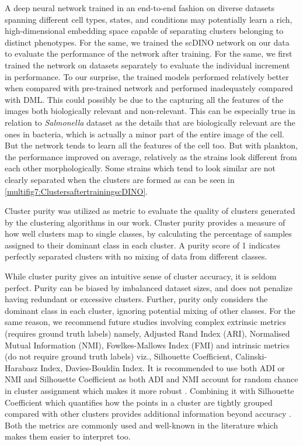\documentclass[12pt,a4paper]{article}
\begin{document}
A deep neural network trained in an end-to-end fashion on diverse datasets spanning different cell types, states, and conditions may potentially learn a rich, high-dimensional embedding space capable of separating clusters belonging to distinct phenotypes. For the same, we trained the scDINO network on our data to evaluate the performance of the network after training. For the same, we first trained the network on datasets separately to evaluate the individual increment in performance. To our surprise, the trained models performed relatively better when compared with pre-trained network and performed inadequately compared with DML. This could possibly be due to the capturing all the features of the images both biologically relevant and non-relevant. This can be especially true in relation to \textit{Salmonella} dataset as the details that are biologically relevant are the ones in bacteria, which is actually a minor part of the entire image of the cell. But the network tends to learn all the features of the cell too. But with plankton, the performance improved on average, relatively as the strains look different from each other morphologically. Some strains which tend to look similar are not clearly separated when the clusters are formed as can be seen in \ref{multifig7:ClustersaftertrainingscDINO}.

Cluster purity was utilized as metric to evaluate the quality of clusters generated by the clustering algorithms in our work. Cluster purity provides a measure of how well clusters map to single classes, by calculating the percentage of samples assigned to their dominant class in each cluster. A purity score of 1 indicates perfectly separated clusters with no mixing of data from different classes.

While cluster purity gives an intuitive sense of cluster accuracy, it is seldom perfect. Purity can be biased by imbalanced dataset sizes, and does not penalize having redundant or excessive clusters. Further, purity only considers the dominant class in each cluster, ignoring potential mixing of other classes. For the same reason, we recommend future studies involving complex extrinsic metrics (requires ground truth labels) namely, Adjusted Rand Index (ARI), Normalised Mutual Information (NMI), Fowlkes-Mallows Index (FMI) and intrinsic metrics (do not require ground truth labels) viz., Silhouette Coefficient, Calinski-Harabasz Index, Davies-Bouldin Index. It is recommended to use both ADI or NMI and Silhouette Coefficient as both ADI and NMI account for random chance in cluster assignment which makes it more robust \cite{ARI, NMI}. Combining it with Silhouette Coefficient which quantifies how the points in a cluster are tightly grouped compared with other clusters provides additional information beyond accuracy \cite{silhouettecoefficient}. Both the metrics are commonly used and well-known in the literature which makes them easier to interpret too.
\end{document}
